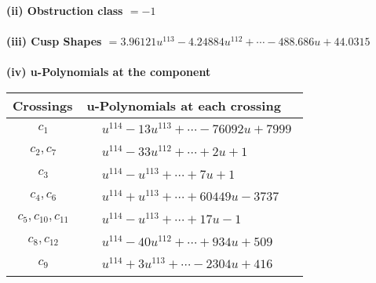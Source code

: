 \documentclass[1p]{elsarticle_modified}
\theoremstyle{definition}
\begin{document}
\flushleft \textbf{(ii) Obstruction class $= -1$}\\~\\
\flushleft \textbf{(iii) Cusp Shapes $= 3.96121 u^{113}-4.24884 u^{112}+\cdots-488.686 u+44.0315$}\\~\\
\newpage\renewcommand{\arraystretch}{1}
\flushleft \textbf{(iv) u-Polynomials at the component}\newline \\
\begin{tabular}{m{50pt}|m{274pt}}
Crossings & \hspace{64pt}u-Polynomials at each crossing \\
\hline $$\begin{aligned}c_{1}\end{aligned}$$&$\begin{aligned}
&u^{114}-13 u^{113}+\cdots-76092 u+7999
\end{aligned}$\\
\hline $$\begin{aligned}c_{2},c_{7}\end{aligned}$$&$\begin{aligned}
&u^{114}-33 u^{112}+\cdots+2 u+1
\end{aligned}$\\
\hline $$\begin{aligned}c_{3}\end{aligned}$$&$\begin{aligned}
&u^{114}- u^{113}+\cdots+7 u+1
\end{aligned}$\\
\hline $$\begin{aligned}c_{4},c_{6}\end{aligned}$$&$\begin{aligned}
&u^{114}+u^{113}+\cdots+60449 u-3737
\end{aligned}$\\
\hline $$\begin{aligned}c_{5},c_{10},c_{11}\end{aligned}$$&$\begin{aligned}
&u^{114}- u^{113}+\cdots+17 u-1
\end{aligned}$\\
\hline $$\begin{aligned}c_{8},c_{12}\end{aligned}$$&$\begin{aligned}
&u^{114}-40 u^{112}+\cdots+934 u+509
\end{aligned}$\\
\hline $$\begin{aligned}c_{9}\end{aligned}$$&$\begin{aligned}
&u^{114}+3 u^{113}+\cdots-2304 u+416
\end{aligned}$\\
\hline
\end{tabular}\\~\\
\end{document}
